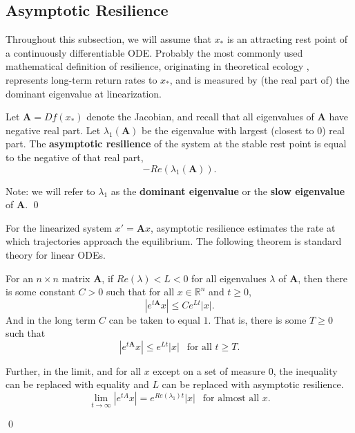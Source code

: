 \subsection{Asymptotic Resilience}
\label{sec:asymp_res}

Throughout this subsection, we will assume that $x_\ast$ is an attracting rest point of a continuously differentiable ODE. Probably the most commonly used mathematical definition of resilience,  originating in theoretical ecology \cite{pimmComplexityStabilityEcosystems1984, mayStabilityComplexityModel1974, hollingResilienceStabilityEcological1973, pimm1991balance}, represents long-term return rates to $x_{\ast}$, and is measured by (the real part of) the dominant eigenvalue at linearization. 

\begin{definition}
	\label{def:asymp}
	 Let $\textbf{A} = Df(x_\ast)$ denote the Jacobian, and recall that all eigenvalues of $\mathbf{A}$ have negative real part. Let $\lambda_1(\textbf{A})$ be the eigenvalue with largest (closest to 0) real part. 	The \textbf{asymptotic resilience} of the system at the stable rest point is equal to the negative of that real part, $$-Re(\lambda_1(\textbf{A})).$$

Note: we will refer to $\lambda_1$ as the \textbf{dominant eigenvalue} or the \textbf{slow eigenvalue} of $\mathbf{A}$. 
	 \qed 
\end{definition}

For the linearized system $x'= \textbf{A}x$, asymptotic resilience estimates the rate at which trajectories approach the equilibrium. The following theorem is standard theory for linear ODEs. %


\begin{theorem}
	For an $n \times n$ matrix $\mathbf{A}$, if $Re(\lambda) < L < 0$ for all eigenvalues $\lambda$ of $\mathbf{A}$, then there is some constant $C>0$ such that for all $x \in \mathbb{R}^n$ and $t \geq 0$,
	$$|e^{t\mathbf{A}}x| \leq Ce^{L t}|x|.$$ 
	And in the long term $C$ can be taken to equal $1$. That is, there is some $T \geq 0$ such that
	$$|e^{t\mathbf{A}}x| \leq e^{L t}|x| ~ ~\text{ for all } t \geq T.$$
	
	Further, in the limit, and for all $x$ except on a set of measure 0, the inequality can be replaced with equality and $L$ can be replaced with asymptotic resilience.
	$$\lim\limits_{t \to \infty} |e^{tA}x| = e^{Re(\lambda_1) t}|x| ~ ~\text{ for almost all } x.$$ 
	
	 \qed
\end{theorem}


